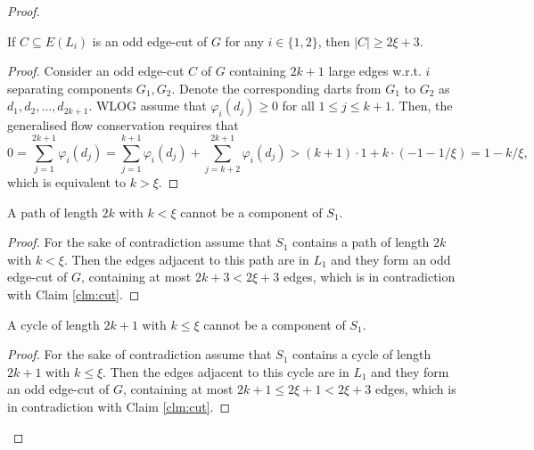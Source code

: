 \begin{proof}
    \begin{claim}
        If $C\subseteq E(L_i)$ is an odd edge-cut of $G$ for any $i\in\{1,2\}$, then $|C|\geq 2\xi+3$. \label{clm:cut}
    \end{claim}
    \begin{proof}
        Consider an odd edge-cut $C$ of $G$ containing $2k+1$ large edges w.r.t. $i$ separating components $G_1, G_2$. Denote the corresponding darts from $G_1$ to $G_2$ as $d_1,d_2,\dots,d_{2k+1}$. WLOG assume that $\varphi_i(d_j) \geq 0$ for all $1\leq j\leq k+1$. Then, the generalised flow conservation requires that
        \begin{equation*}
            0=\sum_{j=1}^{2k+1} \varphi_i(d_j) = \sum_{j=1}^{k+1} \varphi_i(d_j) + \sum_{j=k+2}^{2k+1} \varphi_i(d_j) > (k+1)\cdot 1 + k\cdot(-1-1/\xi) = 1-k/\xi,
        \end{equation*}
        which is equivalent to $k>\xi$.
    \end{proof}

    \begin{claim}
        A path of length $2k$ with $k<\xi$ cannot be a component of $S_1$. \label{clm:path}
    \end{claim}
    \begin{proof}
        For the sake of contradiction assume that $S_1$ contains a path of length $2k$ with $k<\xi$. Then the edges adjacent to this path are in $L_1$ and they form an odd edge-cut of $G$, containing at most $2k+3<2\xi+3$ edges, which is in contradiction with Claim \ref{clm:cut}.
    \end{proof}

    \begin{claim}
        A cycle of length $2k+1$ with $k\leq\xi$ cannot be a component of $S_1$. \label{clm:cycle}
    \end{claim}
    \begin{proof}
        For the sake of contradiction assume that $S_1$ contains a cycle of length $2k+1$ with $k\leq\xi$. Then the edges adjacent to this cycle are in $L_1$ and they form an odd edge-cut of $G$, containing at most $2k+1\leq 2\xi+1<2\xi+3$ edges, which is in contradiction with Claim \ref{clm:cut}.
    \end{proof}


\end{proof}
